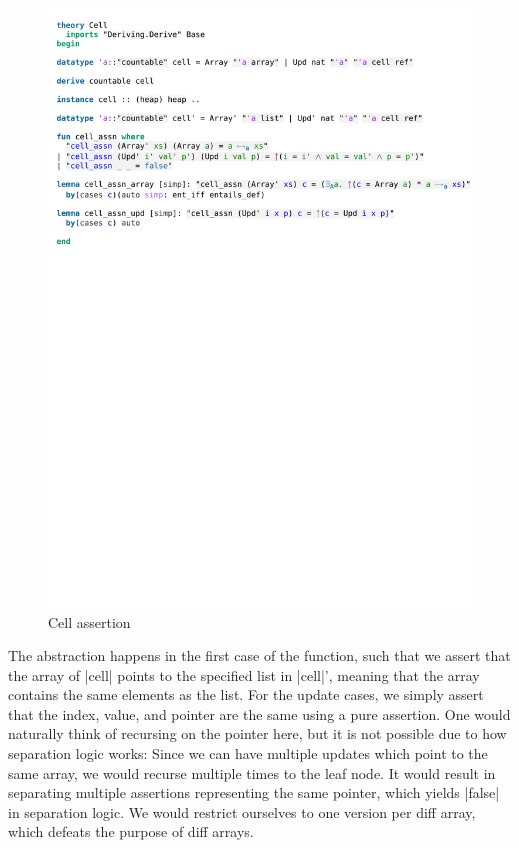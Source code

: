 \begin{figure}[htpb]
    \includegraphics[trim={0 21,4cm 0 6,2cm}, clip, width=1.00\textwidth]{figures/Theory_Cell.pdf}
    \caption[Cell assertion]{Cell assertion}
    \label{fig:cell_assertion}
\end{figure}

\noindent The abstraction happens in the first case of the function, such that we assert that the array of |cell| points to the specified list in |cell|’, meaning that the array contains the same elements as the list. For the update cases, we simply assert that the index, value, and pointer are the same using a pure assertion. One would naturally think of recursing on the pointer here, but it is not possible due to how separation logic works: Since we can have multiple updates which point to the same array, we would recurse multiple times to the leaf node. It would result in separating multiple assertions representing the same pointer, which yields |false| in separation logic. We would restrict ourselves to one version per diff array, which defeats the purpose of diff arrays.

